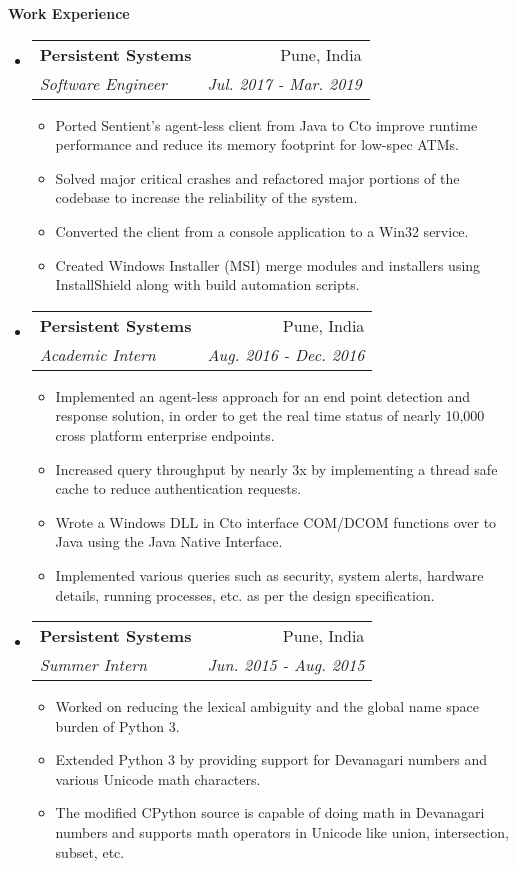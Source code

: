 \documentclass[letterpaper,12pt]{article}
\makeatletter
\def\CC{{C\nolinebreak[4]\hspace{-.05em}\raisebox{.4ex}{\tiny\bf ++ }}}
\newcommand{\resitem}[1]{\item #1 \vspace{-2pt}}
\newcommand{\resheading}[1]{{\large \colorbox{mygrey}{\begin{minipage}{0.989\textwidth}{\textbf{#1 \vphantom{p\^{E}}}}\end{minipage}}}}
\newcommand{\ressubheading}[4]{
    \begin{tabular*}{7.0in}{l@{\extracolsep{\fill}}r}
      \textbf{#1} & #2 \\
      \textit{#3} & \textit{#4} \\
    \end{tabular*}\vspace{-6pt}}
\makeatother
\begin{document}
  \resheading{Work Experience}
  \begin{itemize}
  \item
    \ressubheading{Persistent Systems}{Pune, India}{Software Engineer}{Jul. 2017 - Mar. 2019}
    \begin{itemize}
      \resitem{Ported Sentient's agent-less client from Java to \CC to improve runtime performance and reduce its memory footprint for low-spec ATMs.}
      \resitem{Solved major critical crashes and refactored major portions of the codebase to increase the reliability of the system.}
      \resitem{Converted the client from a console application to a Win32 service.}
      \resitem{Created Windows Installer (MSI) merge modules and installers using InstallShield along with build automation scripts.}
    \end{itemize}
  \item
    \ressubheading{Persistent Systems}{Pune, India}{Academic Intern}{Aug. 2016 - Dec. 2016}
    \begin{itemize}
      \resitem{Implemented an agent-less approach for an end point detection and response solution, in order to get the real time status of nearly 10,000 cross platform enterprise endpoints.}
      \resitem{Increased query throughput by nearly 3x by implementing a thread safe cache to reduce authentication requests.}
      \resitem{Wrote a Windows DLL in \CC to interface COM/DCOM functions over to Java using the Java Native Interface.}
      \resitem{Implemented various queries such as security, system alerts, hardware details, running processes, etc. as per the design specification.}
    \end{itemize}
  \item
    \ressubheading{Persistent Systems}{Pune, India}{Summer Intern}{Jun. 2015 - Aug. 2015}
    \begin{itemize}
      \resitem{Worked on reducing the lexical ambiguity and the global name space burden of Python 3.}
      \resitem{Extended Python 3 by providing support for Devanagari numbers and various Unicode math characters.}
      \resitem{The modified CPython source is capable of doing math in Devanagari numbers and supports math operators in Unicode like union, intersection, subset, etc.}
    \end{itemize}
  \end{itemize}
\end{document}

